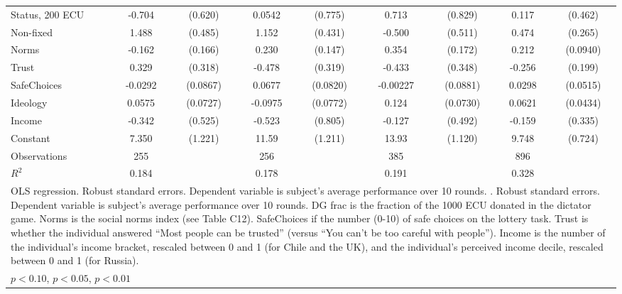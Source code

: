 {\begin{tabular}{l*{4}{cc}}
Status, 200 ECU &   -0.704         &  (0.620)&   0.0542         &  (0.775)&    0.713         &  (0.829)&    0.117         &  (0.462)\\
Non-fixed       &    1.488\sym{***}&  (0.485)&    1.152\sym{***}&  (0.431)&   -0.500         &  (0.511)&    0.474\sym{*}  &  (0.265)\\
Norms           &   -0.162         &  (0.166)&    0.230         &  (0.147)&    0.354\sym{**} &  (0.172)&    0.212\sym{**} & (0.0940)\\
Trust           &    0.329         &  (0.318)&   -0.478         &  (0.319)&   -0.433         &  (0.348)&   -0.256         &  (0.199)\\
SafeChoices     &  -0.0292         & (0.0867)&   0.0677         & (0.0820)& -0.00227         & (0.0881)&   0.0298         & (0.0515)\\
Ideology        &   0.0575         & (0.0727)&  -0.0975         & (0.0772)&    0.124\sym{*}  & (0.0730)&   0.0621         & (0.0434)\\
Income          &   -0.342         &  (0.525)&   -0.523         &  (0.805)&   -0.127         &  (0.492)&   -0.159         &  (0.335)\\
Constant        &    7.350\sym{***}&  (1.221)&    11.59\sym{***}&  (1.211)&    13.93\sym{***}&  (1.120)&    9.748\sym{***}&  (0.724)\\
\hline
Observations    &      255         &         &      256         &         &      385         &         &      896         &         \\
\(R^{2}\)       &    0.184         &         &    0.178         &         &    0.191         &         &    0.328         &         \\
\hline\hline
\multicolumn{9}{p{15cm}}{\tiny OLS regression. Robust standard errors. Dependent variable is subject's average performance over 10 rounds. . Robust standard errors. Dependent variable is subject’s average performance over 10 rounds. DG frac is the fraction of the 1000 ECU donated in the dictator game. Norms is the social norms index (see Table C12). SafeChoices if the number (0-10) of safe choices on the lottery task. Trust is whether the individual answered “Most people can be trusted” (versus “You can’t be too careful with people”). Income is the number of the individual’s income bracket, rescaled between 0 and 1 (for Chile and the UK), and the individual’s perceived income decile, rescaled between 0 and 1 (for Russia).}\\
\multicolumn{9}{l}{\footnotesize \sym{*} \(p<0.10\), \sym{**} \(p<0.05\), \sym{***} \(p<0.01\)}\\
\end{tabular}
}
